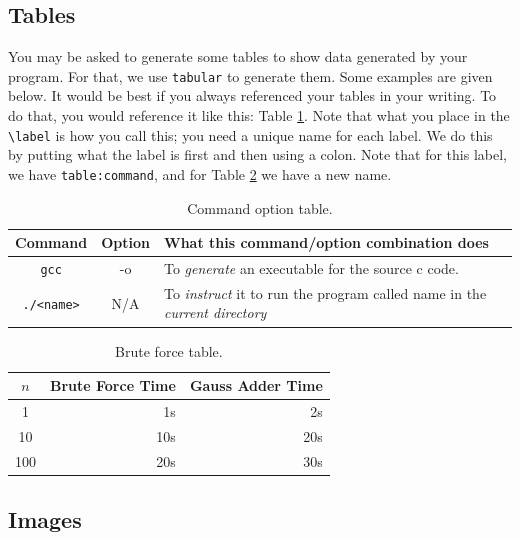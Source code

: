 \documentclass{report}
\begin{document}
\subsection{Tables}
You may be asked to generate some tables to show data generated by your program. For that, we use \texttt{tabular} to generate them. Some examples are given below. It would be best if you always referenced your tables in your writing. To do that, you would reference it like this: Table \ref{table:command}. Note that what you place in the \verb!\label! is how you call this; you need a unique name for each label. We do this by putting what the label is first and then using a colon. Note that for this label, we have \texttt{table:command}, and for Table \ref{table:gauss} we have a new name.
\begin{table}[ht]
\label{table:command}
\caption{Command option table.}
\begin{tabular}{|c|c|p{4.2in}|}

\hline
Command & Option & What this command/option combination does \\
\hline
\hline
\texttt{gcc} & -o & To \emph{generate} an executable for the source c code.\\
\hline
\texttt{./<name>} & N/A & To \emph{instruct} it to run the program called name in the \emph{current directory}\\
\hline
\end{tabular}
\end{table}


\begin{table}
\caption{Brute force table.}
\label{table:gauss}
\begin{center} \begin{tabular}{|c|r|r|}
\hline
$n$ & Brute Force Time & Gauss Adder Time \\
\hline
\hline
1 & 1s & 2s\\ \hline
10 & 10s & 20s\\ \hline
100 & 20s & 30s\\ \hline
\end{tabular} \end{center}
\end{table}

\subsection{Images}
\end{document}
